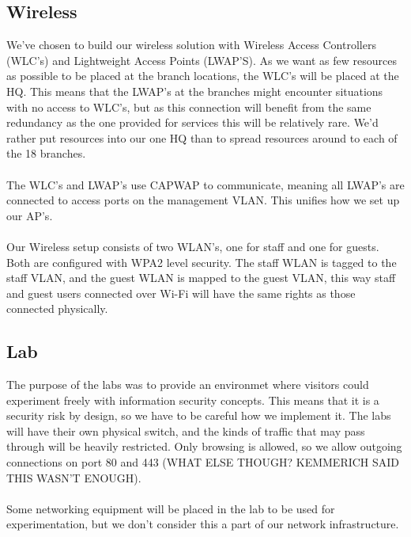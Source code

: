 \subsection{Wireless}


We've chosen to build our wireless solution with Wireless Access Controllers (WLC's) and Lightweight Access Points (LWAP'S). As we want as few resources as possible to be placed at the branch locations, the WLC's will be placed at the HQ. This means that the LWAP's at the branches might encounter situations with no access to WLC's, but as this connection will benefit from the same redundancy as the one provided for services this will be relatively rare. We'd rather put resources into our one HQ than to spread resources around to each of the 18 branches.
\\
\\
The WLC's and LWAP's use CAPWAP to communicate, meaning all LWAP's are connected to access ports on the management VLAN. This unifies how we set up our AP's.
\\
\\
Our Wireless setup consists of two WLAN's, one for staff and one for guests. Both are configured with WPA2 level security. The staff WLAN is tagged to the staff VLAN, and the guest WLAN is mapped to the guest VLAN, this way staff and guest users connected over Wi-Fi will have the same rights as those connected physically.

\subsection{Lab}


The purpose of the labs was to provide an environmet where visitors could experiment freely with information security concepts. This means that it is a security risk by design, so we have to be careful how we implement it. The labs will have their own physical switch, and the kinds of traffic that may pass through will be heavily restricted. Only browsing is allowed, so we allow outgoing connections on port 80 and 443 (WHAT ELSE THOUGH? KEMMERICH SAID THIS WASN'T ENOUGH). 
\\
\\
Some networking equipment will be placed in the lab to be used for experimentation, but we don't consider this a part of our network infrastructure.

